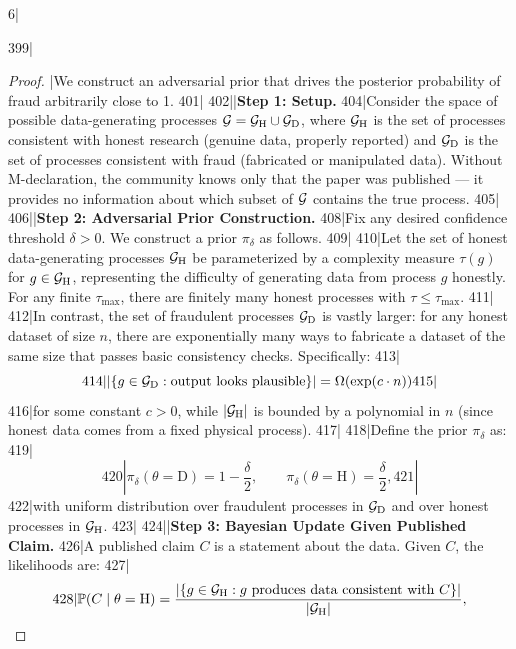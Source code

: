 6|\documentclass[12pt,a4paper]{article}
\begin{document}
399|\begin{proof}|We construct an adversarial prior that drives the posterior probability of fraud arbitrarily close to 1.
401|
402||\noindent\textbf{Step 1: Setup.}
404|Consider the space of possible data-generating processes $\mathcal{G} = \mathcal{G}_{\text{H}} \cup \mathcal{G}_{\text{D}}$, where $\mathcal{G}_{\text{H}}$ is the set of processes consistent with honest research (genuine data, properly reported) and $\mathcal{G}_{\text{D}}$ is the set of processes consistent with fraud (fabricated or manipulated data). Without M-declaration, the community knows only that the paper was published — it provides no information about which subset of $\mathcal{G}$ contains the true process.
405|
406||\noindent\textbf{Step 2: Adversarial Prior Construction.}
408|Fix any desired confidence threshold $\delta > 0$. We construct a prior $\pi_\delta$ as follows.
409|
410|Let the set of honest data-generating processes $\mathcal{G}_{\text{H}}$ be parameterized by a complexity measure $\tau(g)$ for $g \in \mathcal{G}_{\text{H}}$, representing the difficulty of generating data from process $g$ honestly. For any finite $\tau_{\max}$, there are finitely many honest processes with $\tau \le \tau_{\max}$.
411|
412|In contrast, the set of fraudulent processes $\mathcal{G}_{\text{D}}$ is vastly larger: for any honest dataset of size $n$, there are exponentially many ways to fabricate a dataset of the same size that passes basic consistency checks. Specifically:
413|\begin{equation}
414|    |\{g \in \mathcal{G}_{\text{D}} : \text{output looks plausible}\}| = \Omega(\exp(c \cdot n))
415|\end{equation}
416|for some constant $c > 0$, while $|\mathcal{G}_{\text{H}}|$ is bounded by a polynomial in $n$ (since honest data comes from a fixed physical process).
417|
418|Define the prior $\pi_\delta$ as:
419|\begin{equation}\label{eq:adversarial_prior}
420|    \pi_\delta(\theta = \text{D}) = 1 - \frac{\delta}{2}, \qquad \pi_\delta(\theta = \text{H}) = \frac{\delta}{2},
421|\end{equation}
422|with uniform distribution over fraudulent processes in $\mathcal{G}_{\text{D}}$ and over honest processes in $\mathcal{G}_{\text{H}}$.
423|
424||\noindent\textbf{Step 3: Bayesian Update Given Published Claim.}
426|A published claim $C$ is a statement about the data. Given $C$, the likelihoods are:
427|\begin{equation}
428|    \Pbb(C \mid \theta = \text{H}) = \frac{|\{g \in \cG_{\text{H}} : g \text{ produces data consistent with } C\}|}{|\cG_{\text{H}}|},

\end{equation}
\end{proof}
\end{document}
